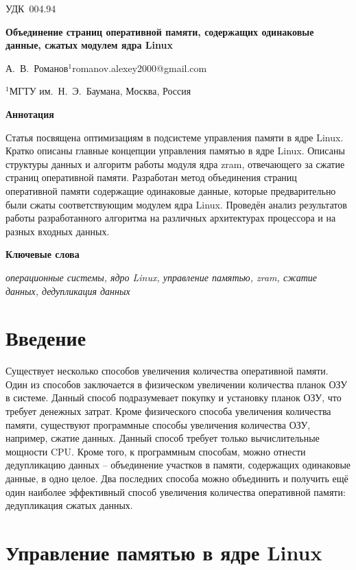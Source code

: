 \documentclass[12pt, a4paper]{article}
\begin{document}
\noindent УДК~004.94

\hfill

\noindent \textbf{Объединение страниц оперативной памяти, содержащих одинаковые данные, сжатых модулем ядра Linux}

\noindent А.~В.~Романов$^{1}$\hfill romanov.alexey2000@gmail.com

\noindent $^{1}$МГТУ им.~Н.~Э.~Баумана, Москва, Россия

\hfill

\noindent \textbf{Аннотация}

\noindent Статья посвящена оптимизациям в подсистеме управления памяти в ядре Linux. Кратко описаны главные концепции управления памятью в ядре Linux. Описаны структуры данных и алгоритм работы модуля ядра zram, отвечающего за сжатие страниц оперативной памяти. Разработан метод объединения страниц оперативной памяти содержащие одинаковые данные, которые предварительно были сжаты соответствующим модулем ядра Linux. Проведён анализ результатов работы разработанного алгоритма на различных архитектурах процессора и на разных входных данных.

\noindent \textbf{Ключевые слова}

\noindent \textit{операционные системы, ядро Linux, управление памятью, zram, сжатие данных, дедупликация данных}

\hfill

\section*{Введение}

Существует несколько способов увеличения количества оперативной памяти. Один из способов заключается в физическом увеличении количества планок ОЗУ в системе. Данный способ подразумевает покупку и установку планок ОЗУ, что требует денежных затрат. Кроме физического способа увеличения количества памяти, существуют программные способы увеличения количества ОЗУ, например, сжатие данных. Данный способ требует только вычислительные мощности CPU. Кроме того, к программным способам, можно отнести дедупликацию данных -- объединение участков в памяти, содержащих одинаковые данные, в одно целое. Два последних способа можно объединить и получить ещё один наиболее эффективный способ увеличения количества оперативной памяти: дедупликация сжатых данных.

\section{Управление памятью в ядре Linux}
\end{document}

